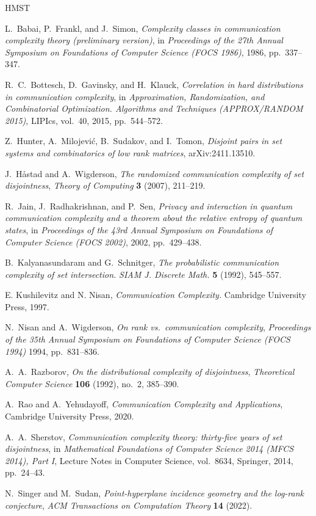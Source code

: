 \documentclass[11pt]{amsart}
\theoremstyle{definition}
\begin{document}
\begin{thebibliography}{HMST}

L.~Babai, P.~Frankl, and J.~Simon,
\emph{Complexity classes in communication complexity theory (preliminary version)},
in \emph{Proceedings of the 27th Annual Symposium on Foundations of Computer Science (FOCS 1986)}, 1986, pp.~337--347.

R.~C.~Bottesch, D.~Gavinsky, and H.~Klauck,
\emph{Correlation in hard distributions in communication complexity},
in \emph{Approximation, Randomization, and Combinatorial Optimization. Algorithms and Techniques (APPROX/RANDOM 2015)},
LIPIcs, vol.~40, 2015, pp.~544--572.

Z.~Hunter, A.~Milojevi\'c, B.~Sudakov, and I.~Tomon,
\emph{Disjoint pairs in set systems and combinatorics of low rank matrices},
arXiv:2411.13510.

J.~H{\aa}stad and A.~Wigderson,
\emph{The randomized communication complexity of set disjointness},
\emph{Theory of Computing} \textbf{3} (2007), 211--219.

R.~Jain, J.~Radhakrishnan, and P.~Sen,
\emph{Privacy and interaction in quantum communication complexity and a theorem about the relative entropy of quantum states},
in \emph{Proceedings of the 43rd Annual Symposium on Foundations of Computer Science (FOCS 2002)}, 2002, pp.~429--438.

B.~Kalyanasundaram and G.~Schnitger, 
\emph{The probabilistic communication complexity of set intersection.} 
\emph{SIAM J. Discrete Math.} \textbf{5} (1992), 545--557.

E. Kushilevitz and N. Nisan, \emph{Communication Complexity.} Cambridge University Press, 1997.

N.~Nisan and A.~Wigderson,
\emph{On rank vs.\ communication complexity},
\emph{Proceedings of the 35th Annual Symposium on Foundations of Computer Science (FOCS 1994)} 1994, pp.~831--836.

A.~A.~Razborov,
\emph{On the distributional complexity of disjointness},
\emph{Theoretical Computer Science} \textbf{106} (1992), no.~2, 385--390.

A.~Rao and A.~Yehudayoff,
\emph{Communication Complexity and Applications},
Cambridge University Press, 2020.

A.~A.~Sherstov,
\emph{Communication complexity theory: thirty-five years of set disjointness},
in \emph{Mathematical Foundations of Computer Science 2014 (MFCS 2014), Part I},
Lecture Notes in Computer Science, vol.~8634,
Springer, 2014, pp.~24--43.

N.~Singer and M.~Sudan,
\emph{Point-hyperplane incidence geometry and the log-rank conjecture},
\emph{ACM Transactions on Computation Theory} \textbf{14} (2022).

\end{thebibliography}
\end{document}

